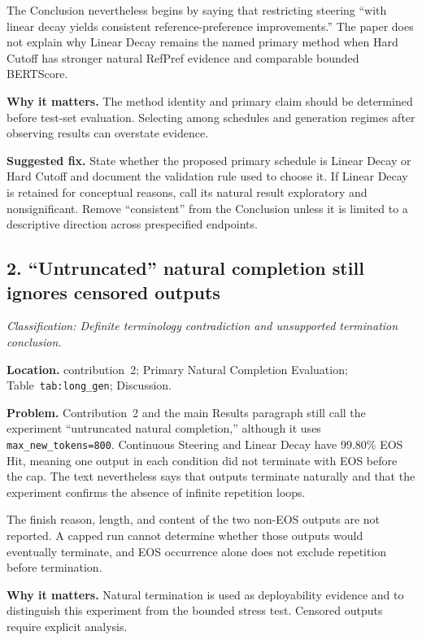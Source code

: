 \documentclass[11pt]{article}
\newcommand{\findinglabel}[1]{\textbf{#1}}
\newcommand{\classification}[1]{\textit{Classification: #1.}}
\begin{document}
The Conclusion nevertheless begins by saying that restricting steering ``with linear decay yields consistent reference-preference improvements.''  The paper does not explain why Linear Decay remains the named primary method when Hard Cutoff has stronger natural RefPref evidence and comparable bounded BERTScore.

\findinglabel{Why it matters.} The method identity and primary claim should be determined before test-set evaluation.  Selecting among schedules and generation regimes after observing results can overstate evidence.

\findinglabel{Suggested fix.} State whether the proposed primary schedule is Linear Decay or Hard Cutoff and document the validation rule used to choose it.  If Linear Decay is retained for conceptual reasons, call its natural result exploratory and nonsignificant.  Remove ``consistent'' from the Conclusion unless it is limited to a descriptive direction across prespecified endpoints.

\subsection*{2. ``Untruncated'' natural completion still ignores censored outputs}

\classification{Definite terminology contradiction and unsupported termination conclusion}

\findinglabel{Location.} contribution~2; Primary Natural Completion Evaluation; Table~\texttt{tab:long\_gen}; Discussion.

\findinglabel{Problem.} Contribution~2 and the main Results paragraph still call the experiment ``untruncated natural completion,'' although it uses \texttt{max\_new\_tokens=800}.  Continuous Steering and Linear Decay have 99.80\% EOS Hit, meaning one output in each condition did not terminate with EOS before the cap.  The text nevertheless says that outputs terminate naturally and that the experiment confirms the absence of infinite repetition loops.

The finish reason, length, and content of the two non-EOS outputs are not reported.  A capped run cannot determine whether those outputs would eventually terminate, and EOS occurrence alone does not exclude repetition before termination.

\findinglabel{Why it matters.} Natural termination is used as deployability evidence and to distinguish this experiment from the bounded stress test.  Censored outputs require explicit analysis.
\end{document}
